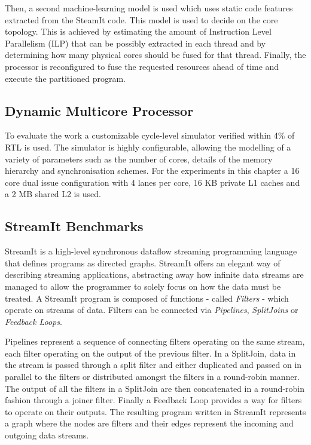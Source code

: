 Then, a second machine-learning model is used which uses static code features extracted from the SteamIt code.
This model is used to decide on the core topology.
This is achieved by estimating the amount of Instruction Level Parallelism (ILP) that can be possibly extracted in each thread and by determining how many physical cores should be fused for that thread.
Finally, the processor is reconfigured to fuse the requested resources ahead of time and execute the partitioned program.


\subsection{Dynamic Multicore Processor}

To evaluate the work a customizable cycle-level simulator verified within 4\% of RTL is used.
The simulator is highly configurable, allowing the modelling of a variety of parameters such as the number of cores, details of the memory hierarchy and synchronisation schemes.
For the experiments in this chapter a 16 core dual issue configuration with 4 lanes per core, 16 KB private L1 caches and a 2 MB shared L2 is used.

\subsection{StreamIt Benchmarks}

StreamIt is a high-level synchronous dataflow streaming programming language that defines programs as directed graphs.
StreamIt offers an elegant way of describing streaming applications, abstracting away how infinite data streams are managed to allow the programmer to solely focus on how the data must be treated.
A StreamIt program is composed of functions - called \textit{Filters} - which operate on streams of data.
Filters can be connected via \textit{Pipelines}, \textit{SplitJoins} or \textit{Feedback Loops}.

Pipelines represent a sequence of connecting filters operating on the same stream, each filter operating on the output of the previous filter.
In a SplitJoin, data in the stream is passed through a split filter and either duplicated and passed on in parallel to the filters or distributed amongst the filters in a round-robin manner.
The output of all the filters in a SplitJoin are then concatenated in a round-robin fashion through a joiner filter.
Finally a Feedback Loop provides a way for filters to operate on their outputs.
The resulting program written in StreamIt represents a graph where the nodes are filters and their edges represent the incoming and outgoing data streams.

